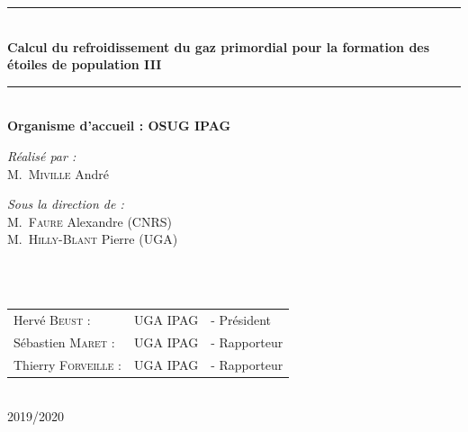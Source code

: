 \documentclass[10pt, a4paper]{report}
\numberwithin{equation}{subsection}
\begin{document}
\begin{titlepage}
\begin{center}
\rule{\linewidth}{0.3mm} \\[0.4cm]
{ \huge \bfseries\color{blue!70!black} Calcul du refroidissement du gaz primordial pour la formation des étoiles de population III \\[0.4cm] }
\rule{\linewidth}{0.3mm} \\[1cm]
{\large \bfseries Organisme d'accueil : OSUG IPAG}\\[1cm]
\noindent
\begin{minipage}{0.4\textwidth}
  \begin{flushleft} \large
    \emph{\color{orange!80!black}Réalisé par :}\\
    M.~\textsc{Miville} André\\
  \end{flushleft}
\end{minipage}%
\begin{minipage}{0.5\textwidth}
  \begin{flushright} \large
    \emph{\color{orange!80!black}Sous la direction de :} \\
    M.~\textsc{Faure} Alexandre (CNRS)\\
    M.~\textsc{Hilly-Blant} Pierre (UGA)\\
  \end{flushright}
\end{minipage}\\[1cm]

\\[0.5cm]

\color{black}
\centering
\begin{tabular}{lll}
\large Hervé \textsc{Beust} : & \large UGA IPAG & \large - Président \\[0.1cm]
\large Sébastien  \textsc{Maret} : & \large UGA IPAG & \large - Rapporteur \\[0.1cm]
\large Thierry \textsc{Forveille} : & \large UGA IPAG & \large - Rapporteur
\end{tabular}

\vfill

{\large \color{orange!80!black}{Année universitaire}\\ \color{blue!80!black}2019/2020}

\end{center}
\end{titlepage}
\end{document}
